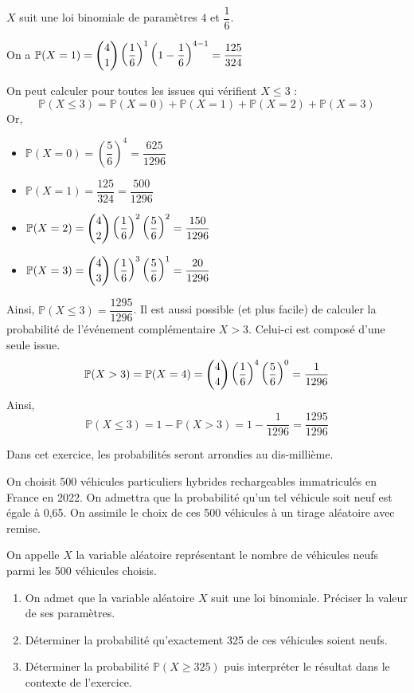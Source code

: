 \documentclass[11pt,fleqn, openany]{book} %
\begin{document}
\begin{solution}$X$ suit une loi binomiale de paramètres $4$ et $\dfrac{1}{6}$. 

On a $\mathbb{P}(X=1)=\dbinom{4}{1} \left(\dfrac{1}{6}\right)^1 \left(1-\dfrac{1}{6}\right)^{4-1}=\dfrac{125}{324}$

On peut calculer pour toutes les issues qui vérifient $X\leqslant3$ : 
\[\mathbb{P}(X \leqslant 3) = \mathbb{P}(X=0)+\mathbb{P}(X=1)+\mathbb{P}(X=2)+\mathbb{P}(X=3)\] 
Or,
\begin{itemize}
\item $\mathbb{P}(X=0)=\left(\dfrac{5}{6}\right)^4=\dfrac{625}{1296}$
\item $\mathbb{P}(X=1)=\dfrac{125}{324}=\dfrac{500}{1296}$
\item $\mathbb{P}(X=2)= \dbinom{4}{2} \left(\dfrac{1}{6}\right)^2 \left(\dfrac{5}{6}\right)^2= \dfrac{150}{1296}$
\item $\mathbb{P}(X=3)= \dbinom{4}{3} \left(\dfrac{1}{6}\right)^3 \left(\dfrac{5}{6}\right)^1= \dfrac{20}{1296}$
\end{itemize}
Ainsi, $\mathbb{P}(X \leqslant 3)=\dfrac{1295}{1296}$. Il est aussi possible (et plus facile) de calculer la probabilité de l'événement complémentaire $X>3$. Celui-ci est composé d'une seule issue.
\[ \mathbb{P}(X>3)=\mathbb{P}(X=4)= \dbinom{4}{4} \left( \dfrac{1}{6}\right)^4 \left( \dfrac{5}{6}\right)^0=\dfrac{1}{1296}\]
Ainsi, 
\[ \mathbb{P}(X\leqslant 3)=1- \mathbb{P}(X>3)=1-\dfrac{1}{1296}=\dfrac{1295}{1296}\]\end{solution}


\begin{exercise}[topic=prob12, subtitle={(Amérique du Nord 2024)}]Dans cet exercice, les probabilités seront arrondies au dis-millième.

On choisit 500 véhicules particuliers hybrides rechargeables immatriculés en France en 2022. On admettra que la probabilité qu'un tel véhicule soit neuf est égale à 0,65.
On assimile le choix de ces 500 véhicules à un tirage aléatoire avec remise.

On appelle $X$ la variable aléatoire représentant le nombre de véhicules neufs parmi les 500 véhicules choisis.
\begin{enumerate}
\item On admet que la variable aléatoire $X$ suit une loi binomiale. Préciser la valeur de ses paramètres.
\item Déterminer la probabilité qu'exactement 325 de ces véhicules soient neufs.
\item Déterminer la probabilité $\mathbb{P}(X \geqslant 325)$ puis interpréter le résultat dans le contexte de l'exercice.\end{enumerate}

\end{exercise}
\end{document}
